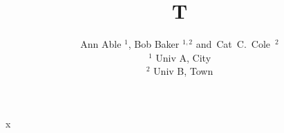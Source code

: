 \documentclass{article}
\begin{document}
\title{T}
\author{{Ann} Able $^{1}$, {Bob} Baker $^{1,2}$ \mbox{and {Cat~C.} Cole $^{2}$}\\
$^1$ Univ A, City\\ $^2$ Univ B, Town}
\maketitle
x
\end{document}
